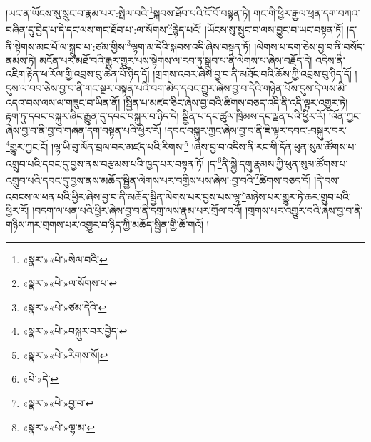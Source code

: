 །ཡང་ན་ཡོངས་སུ་སྲུང་བ་རྣམ་པར་:སྤེལ་བའི་\footnote{«སྣར་»«པེ་»སེལ་བའི་}སྐབས་ཐོབ་པའི་ངོ་བོ་བསྟན་ཏེ། གང་གི་ཕྱིར་རྒྱལ་ཕྲན་དག་བཀའ་བཞིན་དུ་བྱེད་པ་དེ་དང་ལས་གང་ཐོབ་པ་:ལ་སོགས་\footnote{«སྣར་»«པེ་»ལ་སོགས་པ་}རྙེད་པའོ། །ཡོངས་སུ་སྲུང་བ་ལས་བྱུང་བ་ཡང་བསྟན་ཏོ། །ད་ནི་སྟེགས་མང་པོ་ལ་སྒྲུབ་པ་:ཙམ་གྱིས་\footnote{«སྣར་»«པེ་»ཙམ་དེའི་}ལྷག་མ་དེའི་སྐབས་འདི་ཞེས་བསྟན་ཏོ། །ལེགས་པ་དག་ཅེས་བྱ་བ་ནི་བསོད་ནམས་ཏེ། མངོན་པར་མཐོ་བའི་རྒྱུར་གྱུར་པས་སྟེགས་ལ་རབ་ཏུ་སྒྲུབ་པ་ནི་ལེགས་པ་ཞེས་བརྗོད་དེ། འདིས་ནི་འཇིག་རྟེན་ཕ་རོལ་གྱི་འབྲས་བུ་ཆེན་པོ་ཉིད་དོ། །གྲགས་འབར་ཞེས་བྱ་བ་ནི་མཐོང་བའི་ཆོས་ཀྱི་འབྲས་བུ་ཉིད་དོ། །དུས་ལ་བབ་ཅེས་བྱ་བ་ནི་གང་སྔར་བསྟན་པའི་བག་མེད་དབང་གྱུར་ཞེས་བྱ་བ་དེའི་གཉེན་པོས་དུས་དེ་ལས་མི་འདའ་བས་ལས་ལ་གཟུང་བ་ཡིན་ནོ། །སྦྱིན་པ་མཛད་ཅིང་ཞེས་བྱ་བའི་ཚིགས་བཅད་འདི་ནི་འདི་ལྟར་འགྱུར་ཏེ། རྟག་ཏུ་དབང་བསྐུར་ཞིང་རྒྱུན་དུ་དབང་བསྐུར་བ་ཉིད་དེ། སྦྱིན་པ་དང་ཚུལ་ཁྲིམས་དང་ལྡན་པའི་ཕྱིར་རོ། །འོན་ཀྱང་ཞེས་བྱ་བ་ནི་བྱ་བ་གཞན་དག་བསྟན་པའི་ཕྱིར་རོ། །དབང་བསྐུར་ཀྱང་ཞེས་བྱ་བ་ནི་ཇི་ལྟར་དབང་:བསྐུར་བར་\footnote{«སྣར་»«པེ་»བསྐུར་བར་བྱེད་}གྱུར་ཀྱང་ངོ། །ལྷ་ཡི་བུ་ལོན་བྲལ་བར་མཛད་པའི་རིགས།\footnote{«སྣར་»«པེ་»རིགས་སོ།} །ཞེས་བྱ་བ་འདིས་ནི་རང་གི་དོན་ཕུན་སུམ་ཚོགས་པ་འགྲུབ་པའི་དབང་དུ་བྱས་ནས་བརྩམས་པའི་ཁྱད་པར་བསྟན་ཏོ། །ད་\footnote{«པེ་»དེ་}ནི་སྐྱེ་དགུ་རྣམས་ཀྱི་ཕུན་སུམ་ཚོགས་པ་འགྲུབ་པའི་དབང་དུ་བྱས་ནས་མཆོད་སྦྱིན་ལེགས་པར་བགྱིས་པས་ཞེས་:བྱ་བའི་\footnote{«སྣར་»«པེ་»བྱ་བ་}ཚིགས་བཅད་དོ། །དེ་བས་འབངས་ལ་ཕན་པའི་ཕྱིར་ཞེས་བྱ་བ་ནི་མཆོད་སྦྱིན་ལེགས་པར་བྱས་པས་ལྷ་\footnote{«སྣར་»«པེ་»ལྷ་མ་}མཉེས་པར་གྱུར་ཏེ་ཆར་གྲུབ་པའི་ཕྱིར་རོ། །བདག་ལ་ཕན་པའི་ཕྱིར་ཞེས་བྱ་བ་ནི་དགྲ་ལས་རྣམ་པར་གྲོལ་བའོ། །གྲགས་པར་འགྱུར་བའི་ཞེས་བྱ་བ་ནི་གཉིས་ཀར་གྲགས་པར་འགྱུར་བ་ཉིད་ཀྱི་མཆོད་སྦྱིན་གྱི་ཆོ་གའོ། །
